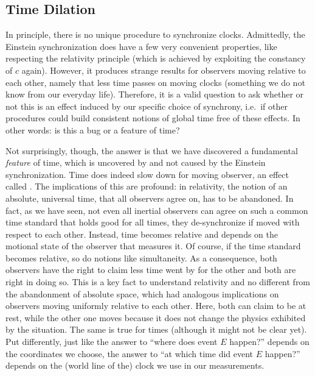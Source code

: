 \documentclass[../relativity_main.tex]{subfiles}
\begin{document}
		\subsection{Time Dilation}
In principle, there is no unique procedure to synchronize clocks. Admittedly, the Einstein synchronization does have a few very convenient properties, like respecting the relativity principle (which is achieved by exploiting the constancy of $c$ again). However, it produces strange results for observers moving relative to each other, namely that less time passes on moving clocks (something we do not know from our everyday life). Therefore, it is a valid question to ask whether or not this is an effect induced by our specific choice of synchrony, i.e.~if other procedures could build consistent notions of global time free of these effects. In other words: is this a bug or a feature of time?






Not surprisingly, though, the answer is that we have discovered a fundamental \emph{feature} of time, which is uncovered by and not caused by the Einstein synchronization. Time does indeed slow down for moving observer, an effect called . The implications of this are profound: in relativity, the notion of an absolute, universal time, that all observers agree on, has to be abandoned. In fact, as we have seen, not even all inertial observers can agree on such a common time standard that holds good for all times, they de-synchronize if moved with respect to each other. Instead, time becomes relative and depends on the motional state of the observer that measures it. Of course, if the time standard becomes relative, so do notions like simultaneity. As a consequence, both observers have the right to claim less time went by for the other and both are right in doing so. This is a key fact to understand relativity and no different from the abandonment of absolute space, which had analogous implications on observers moving uniformly relative to each other. Here, both can claim to be at rest, while the other one moves because it does not change the physics exhibited by the situation. The same is true for times (although it might not be clear yet). Put differently, just like the answer to \enquote{where does event $E$ happen?} depends on the coordinates we choose, the answer to \enquote{at which time did event $E$ happen?} depends on the (world line of the) clock we use in our measurements.
\end{document}
